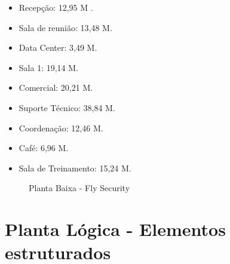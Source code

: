 \documentclass[	DIV=calc,%
							paper=a4,%
							fontsize=12pt,%
							onecolumn]{scrartcl}	 					%
\begin{document}
\begin{itemize}
	\item Recepção: 12,95 M .
	\item Sala de reunião: 13,48 M.
	\item Data Center: 3,49 M.
	\item Sala 1: 19,14 M.
	\item Comercial: 20,21 M.
	\item Suporte Técnico: 38,84 M.
	\item Coordenação: 12,46 M.
	\item Café: 6,96 M.
	\item Sala de Treinamento: 15,24 M.
	\end{itemize}

\clearpage 
\thispagestyle{plain}

\recalctypearea

\begin{figure}
	\noindent{}
	\caption{Planta Baixa - Fly Security}
	\label{plantabaixa}
\end{figure}

\clearpage
{}
\recalctypearea

\section{Planta Lógica - Elementos estruturados}
\end{document}
